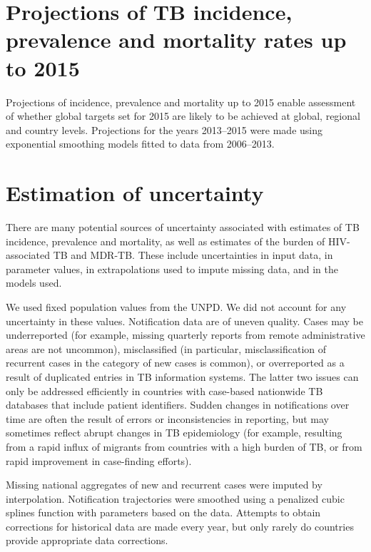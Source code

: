 \section{Projections of TB incidence, prevalence and mortality rates up to 2015} 

Projections of incidence, prevalence and mortality up to 2015 enable assessment of whether global targets set for 2015 are likely to be achieved at global, regional and country levels. Projections for the years 2013–2015 were made using exponential smoothing models fitted to data from 2006–2013.



\section{Estimation of uncertainty}

There are many potential sources of uncertainty associated with estimates of TB incidence, prevalence and mortality, as well as estimates of the burden of HIV-associated TB and MDR-TB. These include uncertainties in input data, in parameter values, in extrapolations used to impute missing data, and in the models used. 

We used fixed population values from the UNPD. We did not account for any uncertainty in these values.  
Notification data are of uneven quality. Cases may be underreported (for example, missing quarterly reports from remote administrative areas are not uncommon), misclassified (in particular, misclassification of recurrent cases in the category of new cases is common), or overreported as a result of duplicated entries in TB information systems. The latter two issues can only be addressed efficiently in countries with case-based nationwide TB databases that include patient identifiers. Sudden changes in notifications over time are often the result of errors or inconsistencies in reporting, but may sometimes reflect abrupt changes in TB epidemiology (for example, resulting from a rapid influx of migrants from countries with a high burden of TB, or from rapid improvement in case-finding efforts). 

Missing national aggregates of new and recurrent cases were imputed by interpolation. Notification trajectories were smoothed using a penalized cubic splines function with parameters based on the data. Attempts to obtain corrections for historical data are made every year, but only rarely do countries provide appropriate data corrections. 

